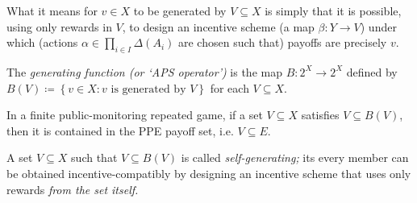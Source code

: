 What it means for $v \in X$ to be generated by $V \subseteq X$ is simply that it is possible, using only rewards in $V$, to design an incentive scheme (a map $\beta : Y \to V$) under which (actions $\alpha \in \prod_{i \in I} \Delta(A_i)$ are chosen such that) payoffs are precisely $v$.

\begin{definition}
	\label{definition:gen_B}
	The \emph{generating function (or `APS operator')} is the map $B : 2^X \to 2^X$ defined by $B(V) \coloneqq \left\{ v \in X : \text{$v$ is generated by $V$} \right\}$ for each $V \subseteq X$.
\end{definition}

\begin{proposition}
	\label{proposition:self-gen}
	In a finite public-monitoring repeated game, if a set $V \subseteq X$ satisfies $V \subseteq B(V)$, then it is contained in the PPE payoff set, i.e. $V \subseteq E$.
\end{proposition}

A set $V \subseteq X$ such that $V \subseteq B(V)$ is called \emph{self-generating;} its every member can be obtained incentive-compatibly by designing an incentive scheme that uses only rewards \emph{from the set itself.}

